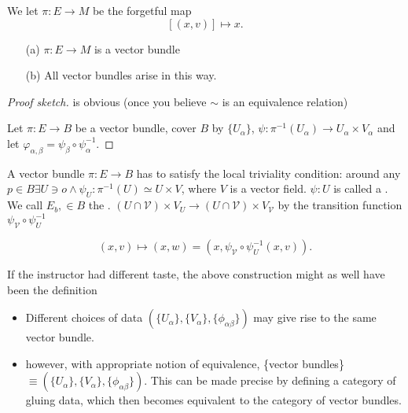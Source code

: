 We let \(\pi:E\to M\) be the forgetful map \[[(x,v)]\mapsto x.\]

\begin{lemma}\label{lem:8.3}
    \begin{enumerate}
        \item[(a)] \(\pi:E\to M\) is a vector bundle
        \item[(b)] All vector bundles arise in this way.  
    \end{enumerate}
\end{lemma}

\begin{proof}[Proof sketch]
     is obvious (once you believe \(\sim\) is an equivalence relation)

     Let \(\pi:E\to B\) be a vector bundle, cover 
    \(B\) by \(\{U_\alpha\}\), \(\psi:\pi^{-1}(U_\alpha)\to U_\alpha\times V_\alpha\) and let \(\varphi_{\alpha,\beta}=\psi_\beta\circ \psi_\alpha^{-1}\). \qedhere 
\end{proof}



 A vector bundle \(\pi:E\to B\) has to satisfy the local triviality condition: around any \(p\in B\exists U\ni o\land \psi_U:\pi^{-1}(U)\simeq U\times V\),
where \(V\) is a vector field. \(\psi:U\) is called a . We call 
\(E_b,\in B\) the . 
\((U\cap \mathcal{V})\times V_U \to (U\cap \mathcal{V})\times V_{\mathcal{V}}\) by the transition function 
\(\psi_\mathcal{V}\circ \psi_{U}^{-1}\)

\[(x,v)\mapsto (x,w)=(x,\psi_\mathcal{V}\circ \psi_{U}^{-1}(x,v)).\]
\begin{remark}
    If the instructor had different taste, the above construction might as well have been the definition
\end{remark}

\begin{remark}
    \begin{itemize}
        \item Different choices of data \((\{U_\alpha\},\{V_\alpha\},\{\phi_{\alpha\beta}\})\) may give rise to 
              the same vector bundle.     
        \item however, with appropriate notion of equivalence, \{vector bundles\} \(\equiv (\{U_\alpha\},\{V_\alpha\},\{\phi_{\alpha\beta}\})\).
              This can be made precise by defining a category of gluing data, which then becomes equivalent to the category of vector bundles. 
    \end{itemize}
\end{remark}

